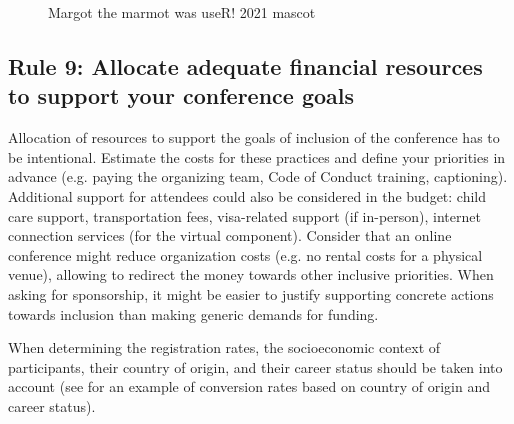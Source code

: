 \documentclass[10pt,letterpaper]{article}
\begin{document}
\begin{figure}[!h]
\centering
{}
\caption{Margot the marmot was useR! 2021 mascot}
\label{fig:marmots}
\end{figure}

\subsection*{Rule 9: Allocate adequate financial resources to support your conference goals}
\label{rule_financial}

Allocation of resources to support the goals of inclusion of the conference has to be intentional. 
Estimate the costs for these practices and define your priorities in advance (e.g. paying the organizing team, Code of Conduct training, captioning).
Additional support for attendees could also be considered in the budget: child care support, transportation fees, visa-related support (if in-person), internet connection services (for the virtual component). 
Consider that an online conference might reduce organization costs (e.g. no rental costs for a physical venue), allowing to redirect the money towards other inclusive priorities. 
When asking for sponsorship, it might be easier to justify supporting concrete actions towards inclusion than making generic demands for funding.


When determining the registration rates, the socioeconomic context of participants, their country of origin, and their career status should be taken into account  \cite{sarabipourChangingScientificMeetings2021, andalibPostdocQueueLabour2018, kaplanPostdocNot2012}
(see \cite{canelon2021cost} for an example of conversion rates based on country of origin and career status). 
\end{document}
